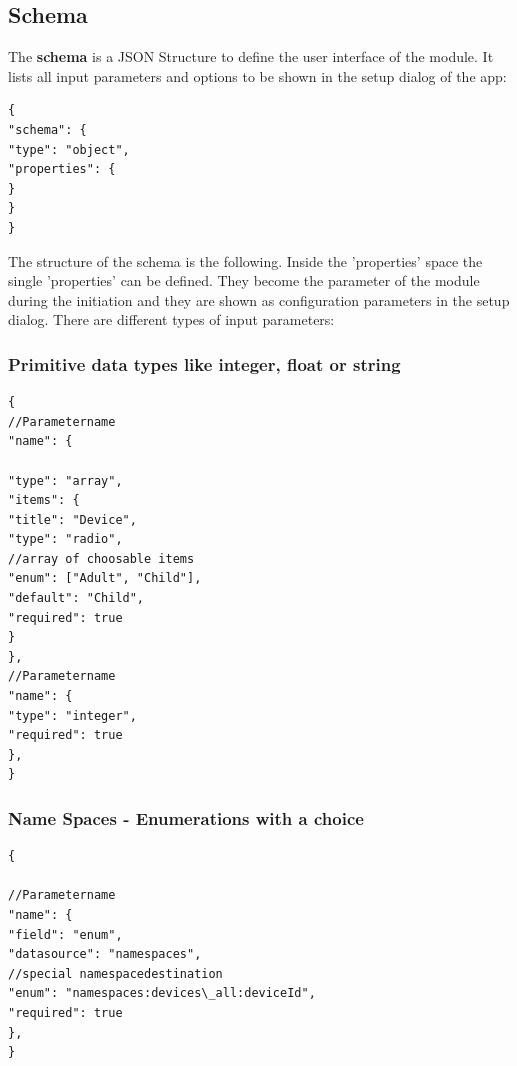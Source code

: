 \subsection{Schema}

The \textbf{schema} is a JSON Structure to define the user interface of the module.
It lists all input parameters and  options to be shown in the setup dialog of the app:

\begin{lstlisting}[caption=Schema Structure,basicstyle=\small,columns=fullflexible]
{
"schema": {
"type": "object",
"properties": {
}
}
}
\end{lstlisting}


The structure of the schema is the following. Inside the 'properties' space the single 'properties' 
can be defined. They become the parameter of the module during the initiation and they 
are shown as configuration parameters in the setup dialog. There are different
types of input parameters:


\subsubsection{Primitive data types like integer, float or string}

\begin{lstlisting}[caption=Schema Structure Simple Type,basicstyle=\small,columns=fullflexible]
{
//Parametername
"name": {

"type": "array",
"items": {
"title": "Device",
"type": "radio",
//array of choosable items
"enum": ["Adult", "Child"],
"default": "Child",
"required": true
}
},
//Parametername
"name": {
"type": "integer",
"required": true
},
}
\end{lstlisting}

\subsubsection{Name Spaces  - Enumerations with a choice}

\begin{lstlisting}[caption=Schema Structure Enumerations with a choice,basicstyle=\small,columns=fullflexible]
{

//Parametername
"name": {
"field": "enum",
"datasource": "namespaces",
//special namespacedestination
"enum": "namespaces:devices\_all:deviceId",
"required": true
},
}
\end{lstlisting}



